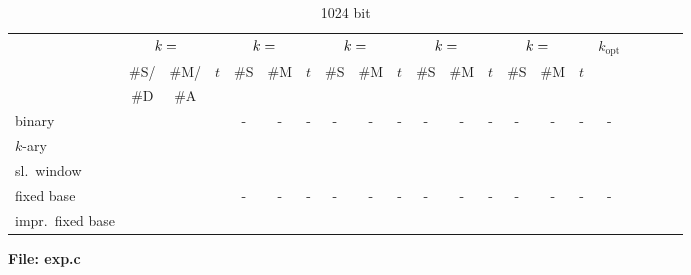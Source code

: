 \documentclass[11pt, a4paper, onecolumn, oneside]{scrartcl}
\begin{document}
\begin{landscape}
\begin{table}[h]
\hspace{-4cm}
\begin{tabular}{|l|c|c|c|c|c|c|c|c|c|c|c|c|c|c|c|c|c|c|c|c}
\hline
&\multicolumn{3}{c|}{$k = \rule{1em}{0ex}$}
&\multicolumn{3}{c|}{$k = \rule{1em}{0ex}$}
&\multicolumn{3}{c|}{$k = \rule{1em}{0ex}$}
&\multicolumn{3}{c|}{$k = \rule{1em}{0ex}$}
&\multicolumn{3}{c|}{$k = \rule{1em}{0ex}$}
&$k_{\mbox{opt}}$\\
        &{\small \#S/} &{\small \#M/} &{\small $t$}
        &{\small \#S} &{\small \#M} &{\small $t$}
        &{\small \#S} &{\small \#M} &{\small $t$}
        &{\small \#S} &{\small \#M} &{\small $t$}
        &{\small \#S} &{\small \#M} &{\small $t$} &\\
        &{\small \#D} &{\small \#A} &&&&&&&&&&&&&&\\
\hline\hline
binary &  &  & &-&-&- &-&-&- &-&-&- &-&-&- &-\\
\hline
$k$-ary &	&	&	&	&	& &	&	& &	&	& &	&	& &\\
\hline
sl.\ window &	&	&	&	&	& &	&	& &	&	& &	&	& &\\
\hline
fixed base & & & &-&-&- &-&-&- &-&-&- &-&-&- &-\\
\hline
impr.\ fixed base &	&	&	&	&	& &	&	& &	&	& &	&	& &\\
\hline
\end{tabular}
\caption{1024 bit}
\end{table}
\end{landscape}


{\large \textbf{File: exp.c}}
\begin{lstlisting}[style=CStyle]
 %TODO: PASTE THE WHOLE CODE FROM exp.c HERE 

\end{lstlisting}
\end{document}
